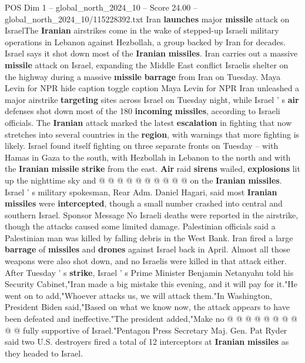 \begin{textsample}{POS Dim 1 – global\_north\_2024\_10 – Score 24.00 – global\_north\_2024\_10/115228392.txt}  \label{ex:f1_pos_090}
Iran \textbf{launches} major \textbf{missile} attack on IsraelThe \textbf{Iranian} airstrikes come in the wake of stepped-up Israeli military operations in Lebanon against Hezbollah, a group backed by Iran for decades.
Israel says it shot down most of the \textbf{Iranian} \textbf{missiles}.
Iran carries out a massive \textbf{missile} attack on Israel, expanding the Middle East conflict Israelis shelter on the highway during a massive \textbf{missile} \textbf{barrage} from Iran on Tuesday.
Maya Levin for NPR hide caption toggle caption Maya Levin for NPR Iran unleashed a major airstrike \textbf{targeting} sites across Israel on Tuesday night, while Israel ' s \textbf{air} defenses shot down most of the 180 \textbf{incoming} \textbf{missiles}, according to Israeli officials.
The \textbf{Iranian} attack marked the latest \textbf{escalation} in fighting that now stretches into several countries in the \textbf{region}, with warnings that more fighting is likely.
Israel found itself fighting on three separate fronts on Tuesday -- with Hamas in Gaza to the south, with Hezbollah in Lebanon to the north and with the \textbf{Iranian} \textbf{missile} \textbf{strike} from the east. \textbf{Air} raid \textbf{sirens} wailed, \textbf{explosions} lit up the nighttime sky and @ @ @ @ @ @ @ @ @ @ on the \textbf{Iranian} \textbf{missiles}.
Israel ' s military spokesman, Rear Adm.
Daniel Hagari, said most \textbf{Iranian} \textbf{missiles} were \textbf{intercepted}, though a small number crashed into central and southern Israel.
Sponsor Message No Israeli deaths were reported in the airstrike, though the attacks caused some limited damage.
Palestinian officials said a Palestinian man was killed by falling debris in the West Bank.
Iran fired a large \textbf{barrage} of \textbf{missiles} and \textbf{drones} against Israel back in April.
Almost all those weapons were also shot down, and no Israelis were killed in that attack either.
After Tuesday ' s \textbf{strike}, Israel ' s Prime Minister Benjamin Netanyahu told his Security Cabinet,"Iran made a big mistake this evening, and it will pay for it."He went on to add,"Whoever attacks us, we will attack them."In Washington, President Biden said,"Based on what we know now, the attack appears to have been defeated and ineffective."The president added,"Make no @ @ @ @ @ @ @ @ @ @ fully supportive of Israel."Pentagon Press Secretary Maj.
Gen.
Pat Ryder said two U.S. destroyers fired a total of 12 interceptors at \textbf{Iranian} \textbf{missiles} as they headed to Israel.

\end{textsample}
